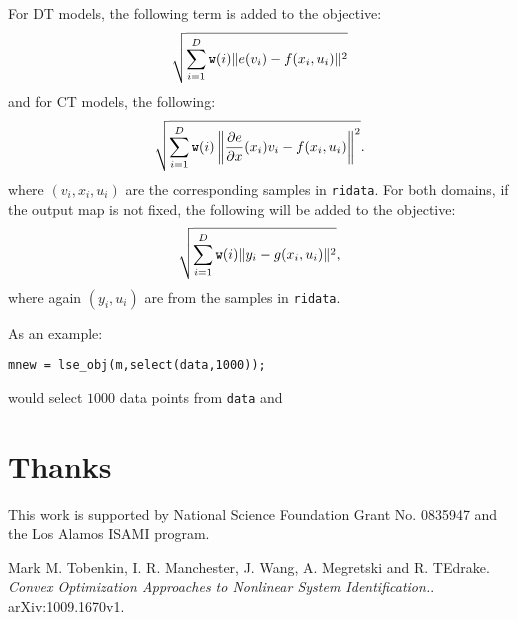\documentclass{article}
\begin{document}
   For DT models, the following term is added to the objective:
$$ \sqrt{\sum_{i=1}^{D} {\tt w}(i)\| e(v_i) - f(x_i,u_i) \|^2}$$
and for CT models, the following:
$$ \sqrt{\sum_{i=1}^{D} {\tt w}(i)\left\| \frac{\partial e}{\partial x}(x_i)v_i -
  f(x_i,u_i) \right\|^2}.$$
where $(v_i,x_i,u_i)$ are the corresponding samples in {\tt ridata}.
For both domains, if the output map is not fixed, the following will
be added to the objective:
$$\sqrt{\sum_{i=1}^{D} {\tt w}(i)\| y_i - g(x_i,u_i) \|^2},$$
where again $(y_i,u_i)$ are from the samples in {\tt ridata}.



As an example:
\begin{verbatim}
mnew = lse_obj(m,select(data,1000));
\end{verbatim}
would select $1000$ data points from {\tt data} and 

\section{Thanks}

This work is  supported by National Science Foundation Grant
No. 0835947 and the Los Alamos ISAMI program.

\begin{thebibliography}{9}

  Mark M. Tobenkin, I. R. Manchester, J. Wang, A. Megretski and R. TEdrake.
  \emph{Convex Optimization Approaches to Nonlinear System Identification.}.
  arXiv:1009.1670v1.
\end{thebibliography}
\end{document}
